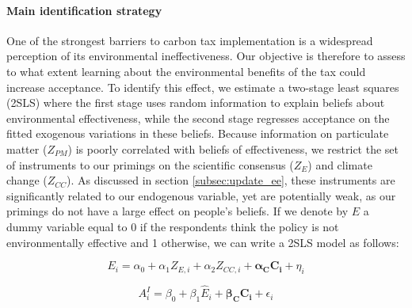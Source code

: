 \documentclass[11pt]{article}
\begin{document}

\paragraph{Main identification strategy}

One of the strongest barriers to carbon tax implementation is a widespread perception of its environmental ineffectiveness. Our objective is therefore to assess to what extent learning about the environmental benefits of the tax could increase acceptance. To identify this effect, we estimate a two-stage least squares (2SLS) where the first stage uses random information to explain beliefs about environmental effectiveness, while the second stage regresses acceptance on the fitted exogenous variations in these beliefs. Because information on particulate matter ($Z_{PM}$) is poorly correlated with beliefs of effectiveness, we restrict the set of instruments to our primings on the scientific consensus ($Z_{E}$) and climate change ($Z_{CC}$). As discussed in section \ref{subsec:update_ee}, these instruments are significantly related to our endogenous variable, yet are potentially weak, as our primings do not have a large effect on people's beliefs. If we denote by $E$ a dummy variable equal to 0 if the respondents think the policy is not environmentally effective and 1 otherwise, we can write a 2SLS model as follows:

\begin{equation}
    E_i = \alpha_0 + \alpha_1 Z_{E,i} + \alpha_2 Z_{CC,i} + \mathbf{\alpha_C C_i}  + \eta_i
    \label{eq:first_stage_parametric_rdd_approve_effective}
\end{equation}

\vspace{-.5cm}

\begin{equation}
    A^I_i = \beta_0 + \beta_1 \widehat{E}_i + \mathbf{\beta_C C_i} + \epsilon_i
    \label{eq:second_stage_parametric_rdd_approve_effective}
\end{equation}

\vspace{.5cm}
\end{document}
